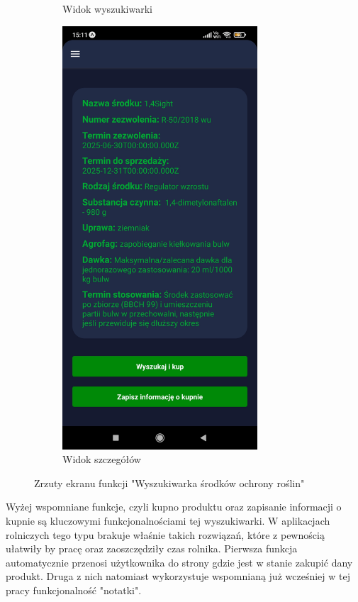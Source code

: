 \documentclass[a4paper,12pt,oneside]{book}
\begin{document}
\begin{figure}[H]
\begin{subfigure}{.5\textwidth}
				\caption{Widok wyszukiwarki}
			\end{subfigure}%
			\begin{subfigure}{.5\textwidth}
				\centering
				\includegraphics[width=0.8\textwidth]{grafika/wysz_b.jpg}
				\caption{Widok szczegółów}
			\end{subfigure}
			\caption{Zrzuty ekranu funkcji "Wyszukiwarka środków ochrony roślin"}
		\end{figure}
	
		Wyżej wspomniane funkcje, czyli kupno produktu oraz zapisanie informacji o kupnie są kluczowymi funkcjonalnościami tej wyszukiwarki. W aplikacjach rolniczych tego typu brakuje właśnie takich rozwiązań, które z pewnością ułatwiły by pracę oraz zaoszczędziły czas rolnika. Pierwsza funkcja automatycznie przenosi użytkownika do strony gdzie jest w stanie zakupić dany produkt. Druga z nich natomiast wykorzystuje wspomnianą już wcześniej w tej pracy funkcjonalność "notatki". 
		
\end{document}

